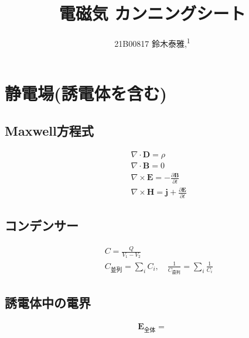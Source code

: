 \documentclass[12pt,dvipdfmx]{jsarticle}
\newcommand\authormark[1]{\textsuperscript{#1}}
\begin{document}
\title{電磁気 カンニングシート}

\author{21B00817 鈴木泰雅,\authormark{1}}
\section*{\Large{静電場(誘電体を含む)}}
\subsection*{Maxwell方程式}
\begin{eqnarray}
  &&\nabla\cdot \bm{D} = \rho\\
  &&\nabla\cdot\bm{B}=0\\
  &&\nabla\times \bm{E} = -\frac{\partial \bm{B}}{\partial t}\\
  &&\nabla\times \bm{H} = \bm{j} + \frac{\partial\bm{E}}{\partial t}
\end{eqnarray}
\subsection*{コンデンサー}
\begin{eqnarray}
  &&C= \frac{Q}{V_1-V_2}\\
  &&C_{並列} = \sum_i C_i,\quad \frac{1}{C_{直列}} = \sum_i \frac{1}{C_i}
\end{eqnarray}
\subsection*{誘電体中の電界}
\begin{eqnarray}
  \bm{E}_{全体} = 
\end{eqnarray}
\end{document}
